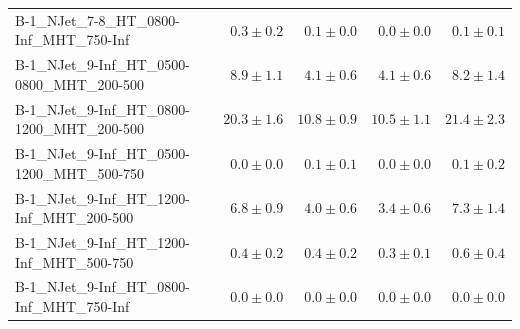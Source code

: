\documentclass{beamer}
\begin{document}
\begin{frame}
\begin{tabular}{lrrrr}
       B-1\_NJet\_7-8\_HT\_0800-Inf\_MHT\_750-Inf &               $0.3\pm0.2$&               $0.1\pm0.0$&               $0.0\pm0.0$&                   $0.1\pm0.1$ \\ 
    B-1\_NJet\_9-Inf\_HT\_0500-0800\_MHT\_200-500 &               $8.9\pm1.1$&               $4.1\pm0.6$&               $4.1\pm0.6$&                   $8.2\pm1.4$ \\ 
    B-1\_NJet\_9-Inf\_HT\_0800-1200\_MHT\_200-500 &              $20.3\pm1.6$&              $10.8\pm0.9$&              $10.5\pm1.1$&                  $21.4\pm2.3$ \\ 
    B-1\_NJet\_9-Inf\_HT\_0500-1200\_MHT\_500-750 &               $0.0\pm0.0$&               $0.1\pm0.1$&               $0.0\pm0.0$&                   $0.1\pm0.2$ \\ 
     B-1\_NJet\_9-Inf\_HT\_1200-Inf\_MHT\_200-500 &               $6.8\pm0.9$&               $4.0\pm0.6$&               $3.4\pm0.6$&                   $7.3\pm1.4$ \\ 
     B-1\_NJet\_9-Inf\_HT\_1200-Inf\_MHT\_500-750 &               $0.4\pm0.2$&               $0.4\pm0.2$&               $0.3\pm0.1$&                   $0.6\pm0.4$ \\ 
     B-1\_NJet\_9-Inf\_HT\_0800-Inf\_MHT\_750-Inf &               $0.0\pm0.0$&               $0.0\pm0.0$&               $0.0\pm0.0$&                   $0.0\pm0.0$ \\ 

\bottomrule 
\end{tabular}
\end{frame}
\end{document}

